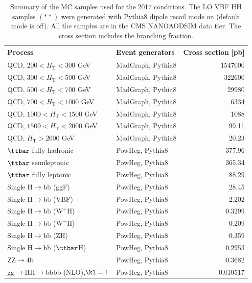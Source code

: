 \begin{table}[htb]
\centering
\caption[Summary of the MC samples used for the 2017 conditions]{\label{samples:tab:MC2017}Summary of the MC samples used for the 2017 conditions. The LO VBF HH samples $(**)$ were generated with Pythia8 dipole recoil mode on (default mode is off). All the samples are in the CMS NANOAODSIM data tier. The cross section includes the branching fraction.}
\begin{tabularx}{\textwidth}{lXr}
\hline
Process & Event generators & Cross section [pb]\\
\hline
QCD, $200  < H_\text{T} < 300$ GeV     & MadGraph, Pythia8   & 1547000 \\
QCD, $300  < H_\text{T} < 500$ GeV     & MadGraph, Pythia8   & 322600  \\
QCD, $500  < H_\text{T} < 700$ GeV     & MadGraph, Pythia8   & 29980   \\
QCD, $700  < H_\text{T} < 1000$ GeV    & MadGraph, Pythia8   & 6334    \\
QCD, $1000 < H_\text{T} < 1500$ GeV    & MadGraph, Pythia8   & 1088    \\
QCD, $1500 < H_\text{T} < 2000$ GeV    & MadGraph, Pythia8   & 99.11   \\
QCD, $H_\text{T} > 2000$ GeV           & MadGraph, Pythia8   & 20.23   \\
$\ttbar$ fully hadronic                & PowHeg, Pythia8     & 377.96  \\
$\ttbar$ semileptonic                  & PowHeg, Pythia8     & 365.34  \\
$\ttbar$ fully leptonic                & PowHeg, Pythia8     & 88.29   \\
Single H$\to$bb (ggF)                  & PowHeg, Pythia8     & 28.45   \\ 
Single H$\to$bb (VBF)                  & PowHeg, Pythia8     & 2.202   \\ 
Single H$\to$bb ($\mathrm{W^{+}H}$)    & PowHeg, Pythia8     & 0.3299  \\ 
Single H$\to$bb ($\mathrm{W^{-}H}$)    & PowHeg, Pythia8     & 0.209   \\ 
Single H$\to$bb ($\mathrm{ZH}$)        & PowHeg, Pythia8     & 0.359   \\ 
Single H$\to$bb ($\ttbar$H)            & PowHeg, Pythia8     & 0.2953  \\ 
ZZ$\rightarrow$4b                      & PowHeg, Pythia8     & 0.3682  \\ 
gg$\to$HH$\to$bbbb (NLO),$\kl = 1$     & PowHeg, Pythia8     & 0.010517\\

\end{tabularx}
\end{table}
